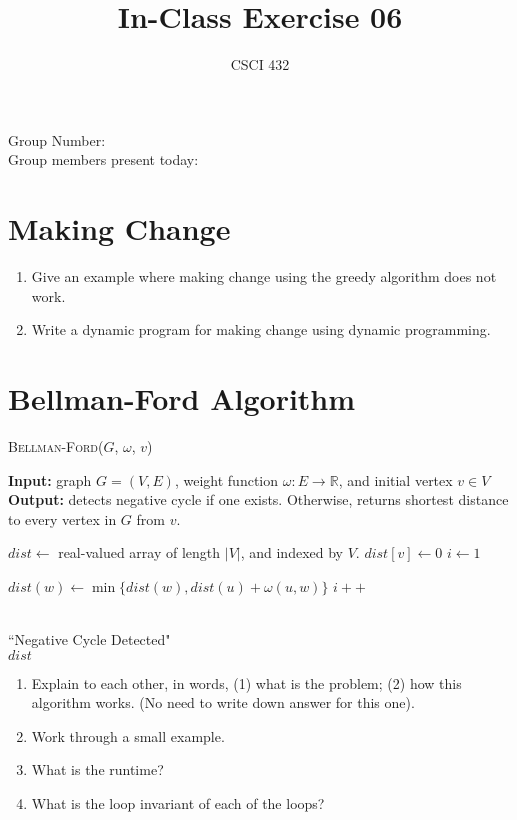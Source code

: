 \documentclass{article}
\title{In-Class Exercise 06}
\author{CSCI 432}
\def\R{{\mathbb R}}
\begin{document}
\maketitle

\noindent
Group Number:\\
Group members present today:

\section*{Making Change}

\begin{enumerate}
    \item Give an example where making change using the greedy algorithm does
        not work.
        \vspace{1in}
    \item Write a dynamic program for making change using dynamic programming.
\end{enumerate}

\newpage
\section*{Bellman-Ford Algorithm}
\begin{algorithm}\caption{\textsc{Bellman-Ford}($G$, $\omega$, $v$)}\label{alg:seb}
    {\bf Input:} graph $G=(V,E)$, weight function $\omega \colon E \to \R$, and initial vertex $v \in V$ \\
    {\bf Output:} detects negative cycle if one exists.  Otherwise, returns
    shortest distance to every vertex in $G$ from $v$.\\
    \begin{algorithmic}[1]
        \State $dist \gets$ real-valued array of length $|V|$, and indexed by $V$.
        \State $dist[v] \gets 0$
        \State $i \gets 1$

                \State $dist(w) \gets \min \{ dist(w), dist(u)+ \omega(u,w) \}$
            \EndFor
            \State $i++$
        \EndWhile

            \\
                \quad\quad\quad \Return ``Negative Cycle Detected"
            \EndIf
        \EndFor\\
        \Return $dist$
    \end{algorithmic}
\end{algorithm}

\begin{enumerate}
    \item Explain to each other, in words, (1) what is the problem; (2) how this
        algorithm works.  (No need to write down answer for this one).
    \item Work through a small example.
    \item What is the runtime?
    \item What is the loop invariant of each of the loops?
\end{enumerate}
\end{document}
